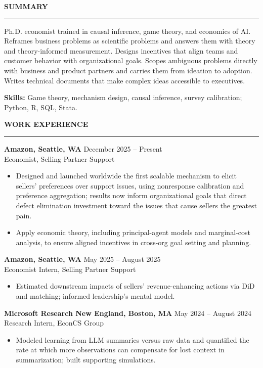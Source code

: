 \documentclass{resume} %
\def\sectionskip{\vspace{2pt}}
\def\sectionlineskip{\vspace{2pt}}
\renewenvironment{rSection}[1]{%
  \sectionskip
  \MakeUppercase{\bf #1}%
  \sectionlineskip
  \hrule
  \begin{list}{}{%
    \setlength{\leftmargin}{1.5em}%
    \setlength{\topsep}{3pt}%
    \setlength{\partopsep}{0pt}%
  }%
  \item[]
}{%
  \end{list}%
}
\begin{document}
\begin{rSection}{Summary}
Ph.D. economist trained in causal inference, game theory, and economics of AI. Reframes business problems as scientific problems and answers them with theory and theory-informed measurement. Designs incentives that align teams and customer behavior with organizational goals. Scopes ambiguous problems directly with business and product partners and carries them from ideation to adoption. Writes technical documents that make complex ideas accessible to executives.

{\bf Skills:} Game theory, mechanism design, causal inference, survey calibration; Python, R, SQL, Stata.
\end{rSection}

\begin{rSection}{Work Experience}
  {\bf Amazon, Seattle, WA} \hfill {December 2025 -- Present} \\
  Economist, Selling Partner Support \vspace{-0.5em}
    \begin{itemize}[label={\tiny\raisebox{1ex}{\textbullet}}]
    \itemsep-0.5em 
    \item Designed and launched worldwide the first scalable mechanism to elicit sellers' preferences over support issues, using nonresponse calibration and preference aggregation; results now inform organizational goals that direct defect elimination investment toward the issues that cause sellers the greatest pain.
    \item Apply economic theory, including principal-agent models and marginal-cost analysis, to ensure aligned incentives in cross-org goal setting and planning.
  \end{itemize} 

  {\bf Amazon, Seattle, WA} \hfill {May 2025 -- August 2025} \\
  Economist Intern, Selling Partner Support \vspace{-0.5em}
    \begin{itemize}[label={\tiny\raisebox{1ex}{\textbullet}}]
    \itemsep-0.5em 
    \item Estimated downstream impacts of sellers' revenue-enhancing actions via DiD and matching; informed leadership's mental model.
  \end{itemize} 

  {\bf Microsoft Research New England, Boston, MA} \hfill {May 2024 -- August 2024} \\
  Research Intern, EconCS Group \vspace{-0.5em}
  \begin{itemize}[label={\tiny\raisebox{1ex}{\textbullet}}]
    \itemsep-0.5em 
    \item Modeled learning from LLM summaries versus raw data and quantified the rate at which more observations can compensate for lost context in summarization; built supporting simulations.
  \end{itemize} 


\end{rSection}
\end{document}

